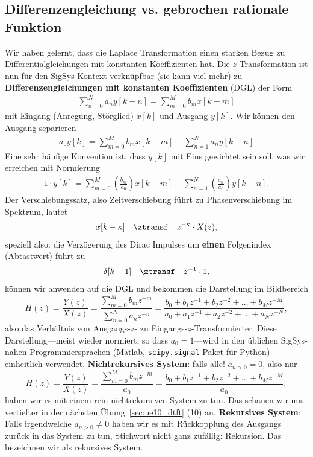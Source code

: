 \subsection*{Differenzengleichung vs. gebrochen rationale Funktion}
Wir haben gelernt, dass die Laplace Transformation einen starken Bezug zu
Differentialgleichungen mit konstanten Koeffizienten hat.
%
Die $z$-Transformation ist nun für den SigSys-Kontext verknüpfbar
(sie kann viel mehr) zu
\textbf{Differenzengleichungen mit konstanten Koeffizienten} (DGL) der Form
\begin{align}
\sum_{n=0}^N a_n y[k-n] = \sum_{m=0}^M b_m x[k-m]
\end{align}
mit Eingang (Anregung, Störglied) $x[k]$ und Ausgang $y[k]$.
%
Wir können den Ausgang separieren
\begin{align}
a_0 y[k] = \sum_{m=0}^M b_m x[k-m] - \sum_{n=1}^N a_n y[k-n]
\end{align}
%
Eine sehr häufige Konvention ist, dass $y[k]$ mit Eins gewichtet sein soll, was wir erreichen mit
Normierung
\begin{align}
1 \cdot y[k] = \sum_{m=0}^M \left(\frac{b_m}{a_0}\right) x[k-m] - \sum_{n=1}^N \left(\frac{a_n}{a_0}\right) y[k-n].
\end{align}
%
Der Verschiebungssatz, also Zeitverschiebung führt zu
Phasenverschiebung im Spektrum, lautet
\begin{align}
x[k-\kappa] \quad\ztransf\quad z^{-\kappa} \cdot X(z),
\end{align}
speziell also: die Verzögerung des Dirac Impulses um \textbf{einen} Folgenindex (Abtastwert)
führt zu
\begin{align}
\delta[k-1] \quad\ztransf\quad z^{-1} \cdot 1,
\end{align}
können wir anwenden auf die DGL und bekommen die Darstellung im Bildbereich
\begin{equation}
H(z) = \frac{Y(z)}{X(z)} =
\frac{\sum\limits_{m=0}^{M} b_m z^{-m}}{\sum\limits_{n=0}^{N} a_n z^{-n}}=
\frac{b_0 + b_1 z^{-1} + b_2 z^{-2} + \dots + b_M z^{-M}}{a_0 + a_1 z^{-1} + a_2 z^{-2} + \dots + a_N z^{-N}},
\end{equation}
also das Verhältnis von Ausgangs-$z$- zu Eingangs-$z$-Transformierter.
Diese Darstellung---meist wieder normiert, so dass $a_0=1$---wird in
den üblichen SigSys-nahen Programmiersprachen (Matlab,
\texttt{scipy.signal} Paket für Python) einheitlich verwendet.
\textbf{Nichtrekursives System}: falls alle! $a_{n>0} = 0$, also nur
\begin{equation}
H(z) = \frac{Y(z)}{X(z)} =
\frac{\sum\limits_{m=0}^{M} b_m z^{-m}}{a_0}=
\frac{b_0 + b_1 z^{-1} + b_2 z^{-2} + \dots + b_M z^{-M}}{a_0},
\end{equation}
haben wir es mit einem rein-nichtrekursiven System zu tun. Das schauen wir uns
vertiefter in der nächsten Übung~\ref{sec:ue10_dtft} (10) an.
%
\textbf{Rekursives System}: Falls irgendwelche
$a_{n>0} \neq 0$ haben wir es mit Rückkopplung des Ausgangs zurück in das System zu tun,
Stichwort nicht ganz zufällig: Rekursion. Das bezeichnen wir als rekursives System.

